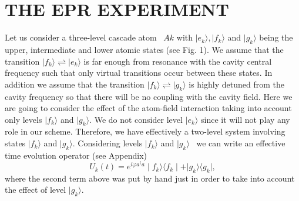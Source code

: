 \documentclass[12pt,thmsa]{article}
\begin{document}
\section{THE EPR EXPERIMENT\protect\bigskip}

Let us consider a three-level cascade atom \ $Ak$ with $\mid e_{k}\rangle
,\mid f_{k}\rangle $ and $\mid g_{k}\rangle $ being the upper, intermediate
and lower atomic states (see Fig. 1). We assume that the transition $\mid
f_{k}\rangle \rightleftharpoons \mid e_{k}\rangle $ is far enough from
resonance with the cavity central frequency such that only virtual
transitions occur between these states. In addition we assume that the
transition $\mid f_{k}\rangle \rightleftharpoons \mid g_{k}\rangle $ is
highly detuned from the cavity frequency so that there will be no coupling
with the cavity field. Here we are going to consider the effect of the
atom-field interaction taking into account only levels $\mid f_{k}\rangle $
and $\mid g_{k}\rangle .$ We do not consider level $\mid e_{k}\rangle $
since it will not play any role in our scheme. Therefore, we have
effectively a two-level system involving states $\mid f_{k}\rangle $ and $%
|g_{k}\rangle $. Considering levels $\mid f_{k}\rangle $ and $\mid
g_{k}\rangle $ \ we can write an effective time evolution operator (see
Appendix) 
\begin{equation}
U_{k}(t)=e^{i\varphi a^{\dagger }a}\mid f_{k}\rangle \langle f_{k}\mid
+|g_{k}\rangle \langle g_{k}\mid ,  \label{U}
\end{equation}%
where the second term above was put by hand just in order to take into
account the effect of level $\mid g_{k}\rangle $.
\end{document}
